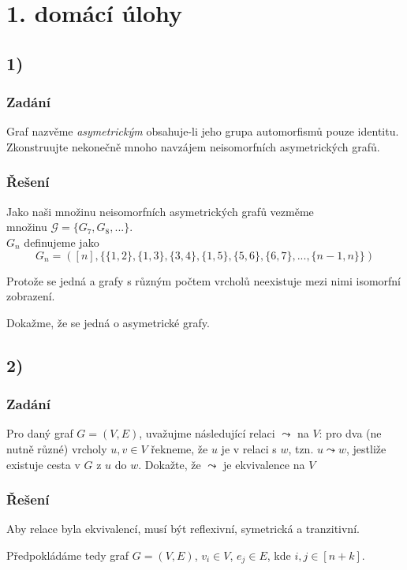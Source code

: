 \documentclass[../main.tex]{subfiles}
\begin{document}
\section*{1. domácí úlohy}

\subsection*{1)}
\subsubsection*{Zadání}
Graf nazvěme \textit{asymetrickým} obsahuje-li jeho grupa automorfismů pouze identitu.
Zkonstruujte nekonečně mnoho navzájem neisomorfních asymetrických grafů.
\subsubsection*{Řešení}
Jako naši množinu neisomorfních asymetrických grafů vezměme\\ množinu $\mathcal{G} = \{G_7, G_8, ...\}$.\\
$G_n$ definujeme jako
\begin{equation*}
    G_n = ([n], \{\{ 1,2 \}, \{ 1,3\}, \{ 3,4 \}, \{ 1,5 \}, \{ 5,6 \}, \{ 6,7 \}, ..., \{ n-1, n \} \} )
\end{equation*}

Protože se jedná a grafy s různým počtem vrcholů neexistuje mezi nimi isomorfní zobrazení. 

Dokažme, že se jedná o asymetrické grafy. 



\subsection*{2)}
\subsubsection*{Zadání}
Pro daný graf $G=(V,E)$, uvažujme následující relaci $\leadsto$ na $V$: pro dva (ne nutně různé) vrcholy $u,v\in V$ řekneme, že 
$u$ je v relaci s $w$, tzn. $u\leadsto w$, jestliže existuje cesta v $G$ z $u$ do $w$. Dokažte, že $\leadsto$ je ekvivalence na $V$
\subsubsection*{Řešení}
Aby relace byla ekvivalencí, musí být reflexivní, symetrická a tranzitivní.

Předpokládáme tedy graf $G=(V,E)$, $v_i\in V$, $e_j\in E$, kde $i,j \in [n+k]$.
\end{document}
